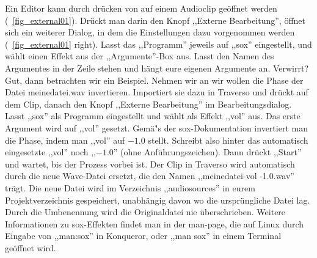 Ein Editor kann durch drücken von  auf einem Audioclip geöffnet werden (\FigB~\ref{fig_external01}). Drückt man darin den Knopf ,,Externe Bearbeitung'', öffnet sich ein weiterer Dialog, in dem die Einstellungen dazu vorgenommen werden (\FigB~\ref{fig_external01} right). Lasst das ,,Programm'' jeweils auf ,,sox'' eingestellt, und wählt einen Effekt aus der ,,Argumente''-Box aus. Lasst den Namen des Argumentes in der Zeile stehen und hängt eure eigenen Argumente an. Verwirrt? Gut, dann betrachten wir ein Beispiel. Nehmen wir an wir wollen die Phase der Datei meinedatei.wav invertieren. Importiert sie dazu in Traverso und drückt  auf dem Clip, danach den Knopf ,,Externe Bearbeitung'' im Bearbeitungsdialog. Lasst ,,sox'' als Programm eingestellt und wählt als Effekt ,,vol'' aus. Das erste Argument wird auf ,,vol'' gesetzt. Gemä"s der sox-Dokumentation invertiert man die Phase, indem man ,,vol'' auf $-1.0$ stellt. Schreibt also hinter das automatisch eingesetzte ,,vol'' noch ,,$-1.0$'' (ohne Anführungszeichen). Dann drückt ,,Start'' und wartet, bis der Prozess vorbei ist. Der Clip in Traverso wird automatisch durch die neue Wave-Datei ersetzt, die den Namen ,,meinedatei-vol -1.0.wav'' trägt. Die neue Datei wird im Verzeichnis ,,audiosources'' in eurem Projektverzeichnis gespeichert, unabhängig davon wo die ursprüngliche Datei lag. Durch die Umbenennung wird die Originaldatei nie überschrieben. Weitere Informationen zu sox-Effekten findet man in der man-page, die auf Linux durch Eingabe von ,,man:sox'' in Konqueror, oder ,,man sox'' in einem Terminal geöffnet wird.